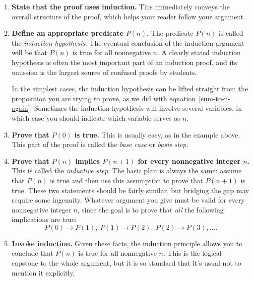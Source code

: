 \begin{enumerate}

\item \textbf{State that the proof uses induction.}  This immediately
  conveys the overall structure of the proof, which helps your reader
  follow your argument.

\item \textbf{Define an appropriate predicate $P(n)$.}  The predicate
  $P(n)$ is called the 
\emph{induction hypothesis}.  The eventual
  conclusion of the induction argument will be that $P(n)$ is true for
  all nonnegative $n$.  A clearly stated induction hypothesis is often
  the most important part of an induction proof, and its omission is
  the largest source of confused proofs by students.

In the simplest cases, the induction hypothesis can be lifted straight
from the proposition you are trying to prove, as we did with
equation~\eqref{sum-to-n-again}.  Sometimes the induction hypothesis
will involve several variables, in which case you should indicate
which variable serves as $n$.

\item \textbf{Prove that $P(0)$ is true.}  This is usually easy, as in the
  example above.  This part of the proof is called the \emph{base case}%
  or \emph{basis step}.\iffalse
  (Sometimes the base case will be $n=1$ or even
  some larger number, in which case the starting value of $n$ also should
  be stated.)\fi

\item \textbf{Prove that $P(n)$ implies $P(n+1)$ for every nonnegative
  integer $n$.}  This is called the \emph{inductive
  step}.  The basic plan is always the
  same: assume that $P(n)$ is true and then use this assumption to
  prove that $P(n+1)$ is true.  These two statements should be fairly
  similar, but bridging the gap may require some ingenuity.  Whatever
  argument you give must be valid for every nonnegative integer $n$,
  since the goal is to prove that \emph{all} the following
  implications are true:
\[
P(0) \rightarrow P(1),\  P(1) \rightarrow  P(2),\  P(2) \rightarrow P(3), \dots.
\]

\item \textbf{Invoke induction.}  Given these facts, the induction
  principle allows you to conclude that $P(n)$ is true for all nonnegative
  $n$.  This is the logical capstone to the whole argument, but it is so
  standard that it's usual not to mention it explicitly.

\end{enumerate}

